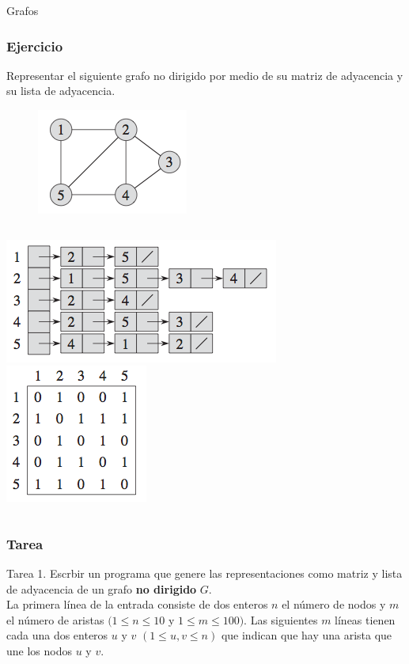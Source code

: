 \documentclass{beamer}
\begin{document}
\begin{section}{Grafos}
	\begin{frame}
		\frametitle{Ejercicio}
		Representar el siguiente grafo no dirigido por medio de su matriz de adyacencia y su lista de adyacencia.
		\begin{figure}
			\includegraphics[height = 0.3\textheight]{ejemplo_graph.png}
		\end{figure}
		\pause
		\begin{columns}
				\includegraphics[height = 0.3\textheight]{lista_graph.png}
				\includegraphics[height = 0.3\textheight]{matriz_graph.png}
		\end{columns}		
	\end{frame}

	\begin{frame}
		\frametitle{Tarea}
		\begin{alertblock}{Tarea 1.}
			Escrbir un programa que genere las representaciones como matriz y lista de adyacencia de un grafo \textbf{no dirigido} $G$.\\
			La primera línea de la entrada consiste de dos enteros $n$ el número de nodos y $m$ el número de aristas $(1 \leq n \leq 10$ y $1 \leq m \leq 100)$. Las siguientes $m$ líneas tienen cada una dos enteros $u$ y $v$ $(1 \leq u, v \leq n)$ que indican que hay una arista que une los nodos $u$ y $v$.
		\end{alertblock}
		

\end{frame}
\end{section}
\end{document}
